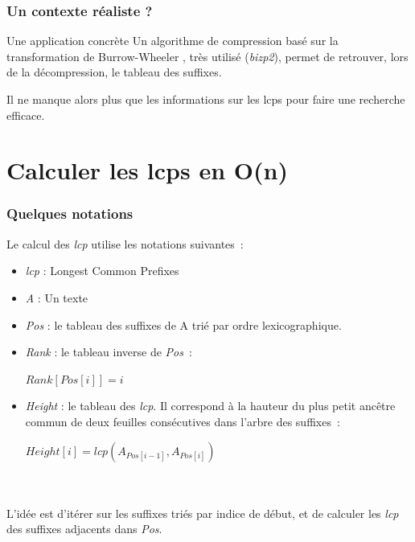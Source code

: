 \documentclass[10pt]{beamer}
\begin{document}
\begin{frame}
  \frametitle{Un contexte réaliste ?}
  
  \begin{block}{Une application concrète}
    Un algorithme de compression basé sur la transformation de
    Burrow-Wheeler \cite{Burrows94}, très utilisé (\emph{bizp2}), permet
    de retrouver, lors de la décompression, le tableau des suffixes. 
    
    Il ne manque alors plus que les informations sur les lcps pour faire
    une recherche efficace. 
  \end{block}

\end{frame}

\section{Calculer les lcps en O(n)}
\label{sec:algo}


\begin{frame}
  \frametitle{Quelques notations}

  Le calcul des \textit{lcp} utilise les notations suivantes~:
  \begin{itemize}
  \item \textit{lcp} : Longest Common Prefixes
  \item \textit{A} : Un texte
  \item \textit{Pos} : le tableau des suffixes de A trié par ordre
    lexicographique.
  \item \textit{Rank} : le tableau inverse de \textit{Pos}~:
    \begin{center}
    $\mathit{Rank}[\mathit{Pos}[i]] = i$
    \end{center}
  \item \textit{Height} : le tableau des \textit{lcp}. Il correspond à la
    hauteur du plus petit ancêtre commun de deux feuilles consécutives dans
    l'arbre des suffixes~:
    \begin{center}
    $\mathit{Height}[i] = \mathit{lcp}(A_{\mathit{Pos}[i-1]},
      A_{\mathit{Pos}[i]})$
    \end{center}
  \end{itemize}
  \hfill \\ \hfill \\

  L'idée est d'itérer sur les suffixes triés par indice de début, et de
  calculer les \textit{lcp} des suffixes adjacents dans \textit{Pos}.
\end{frame}
\end{document}
